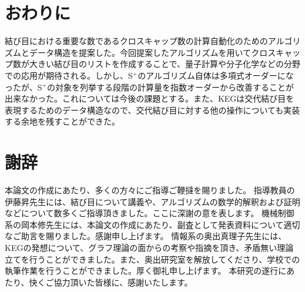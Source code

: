 \documentclass[11pt,a4j]{jarticle}
\newcommand{\splus}{S${}^\text{+}$}
\begin{document}
\section{おわりに}
結び目における重要な数であるクロスキャップ数の計算自動化のためのアルゴリズムとデータ構造を提案した。今回提案したアルゴリズムを用いてクロスキャップ数が大きい結び目のリストを作成することで、量子計算や分子化学などの分野での応用が期待される。しかし、\splus のアルゴリズム自体は多項式オーダーになったが、\splus の対象を列挙する段階の計算量を指数オーダーから改善することが出来なかった。これについては今後の課題とする。また、KEGは交代結び目を表現するためのデータ構造なので、交代結び目に対する他の操作についても実装する余地を残すことができた。

\section*{謝辞} %
本論文の作成にあたり、多くの方々にご指導ご鞭撻を賜りました。
指導教員の伊藤昇先生には、結び目について講義や、アルゴリズムの数学的解釈および証明などについて数多くご指導頂きました。ここに深謝の意を表します。
機械制御系の岡本修先生には、本論文の作成にあたり、副査として発表資料について適切なご助言を賜りました。感謝申し上げます。
情報系の奥出真理子先生には、KEGの発想について、グラフ理論の面からの考察や指摘を頂き、矛盾無い理論立てを行うことができました。また、奥出研究室を解放してくださり、学校での執筆作業を行うことができました。厚く御礼申し上げます。
本研究の遂行にあたり、快くご協力頂いた皆様に、感謝いたします。

\end{document}
